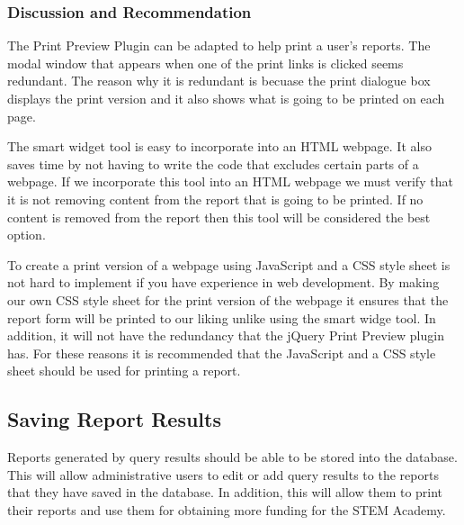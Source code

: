 \documentclass[letterpaper,10pt,serif, draftclsnofoot,onecolumn, compsoc, titlepage]{IEEEtran}
\begin{document}
\subsubsection{Discussion and Recommendation}
The Print Preview Plugin can be adapted to help print a user's reports. The modal window that appears when one of the print links is clicked seems redundant. The reason why it is redundant is becuase the print dialogue box displays the print version and it also shows what is going to be printed on each page. 

The smart widget tool is easy to incorporate into an HTML webpage. It also saves time by not having to write the code that excludes certain parts of a webpage. If we incorporate this tool into an HTML webpage we must verify that it is not removing content from the report that is going to be printed. If no content is removed from the report then this tool will be considered the best option. 

To create a print version of a webpage using JavaScript and a CSS style sheet is not hard to implement if you have experience in web development. By making our own CSS style sheet for the print version of the webpage it ensures that the report form will be printed to our liking unlike using the smart widge tool. In addition, it will not have the redundancy that the jQuery Print Preview plugin has. For these reasons it is recommended that the JavaScript and a CSS style sheet should be used for printing a report. 





\subsection{Saving Report Results}
Reports generated by query results should be able to be stored into the database. This will allow administrative users to edit or add query results to the reports that they have saved in the database. In addition, this will allow them to print their reports and use them for obtaining more funding for the STEM Academy. 
\end{document}
